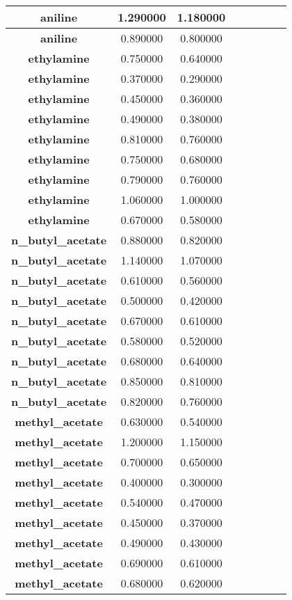 \documentclass{amsart}
\begin{document}
\begin{center}
\begin{tabular}{c|c|c|c|c|c|c|c}
\textbf{aniline}&1.290000&1.180000 \\ \hline 
\textbf{aniline}&0.890000&0.800000 \\ \hline 
\textbf{ethylamine}&0.750000&0.640000 \\ \hline 
\textbf{ethylamine}&0.370000&0.290000 \\ \hline 
\textbf{ethylamine}&0.450000&0.360000 \\ \hline 
\textbf{ethylamine}&0.490000&0.380000 \\ \hline 
\textbf{ethylamine}&0.810000&0.760000 \\ \hline 
\textbf{ethylamine}&0.750000&0.680000 \\ \hline 
\textbf{ethylamine}&0.790000&0.760000 \\ \hline 
\textbf{ethylamine}&1.060000&1.000000 \\ \hline 
\textbf{ethylamine}&0.670000&0.580000 \\ \hline 
\textbf{n\_butyl\_acetate}&0.880000&0.820000 \\ \hline 
\textbf{n\_butyl\_acetate}&1.140000&1.070000 \\ \hline 
\textbf{n\_butyl\_acetate}&0.610000&0.560000 \\ \hline 
\textbf{n\_butyl\_acetate}&0.500000&0.420000 \\ \hline 
\textbf{n\_butyl\_acetate}&0.670000&0.610000 \\ \hline 
\textbf{n\_butyl\_acetate}&0.580000&0.520000 \\ \hline 
\textbf{n\_butyl\_acetate}&0.680000&0.640000 \\ \hline 
\textbf{n\_butyl\_acetate}&0.850000&0.810000 \\ \hline 
\textbf{n\_butyl\_acetate}&0.820000&0.760000 \\ \hline 
\textbf{methyl\_acetate}&0.630000&0.540000 \\ \hline 
\textbf{methyl\_acetate}&1.200000&1.150000 \\ \hline 
\textbf{methyl\_acetate}&0.700000&0.650000 \\ \hline 
\textbf{methyl\_acetate}&0.400000&0.300000 \\ \hline 
\textbf{methyl\_acetate}&0.540000&0.470000 \\ \hline 
\textbf{methyl\_acetate}&0.450000&0.370000 \\ \hline 
\textbf{methyl\_acetate}&0.490000&0.430000 \\ \hline 
\textbf{methyl\_acetate}&0.690000&0.610000 \\ \hline 
\textbf{methyl\_acetate}&0.680000&0.620000 \\ \hline 

\end{tabular}
\end{center}
\end{document}
